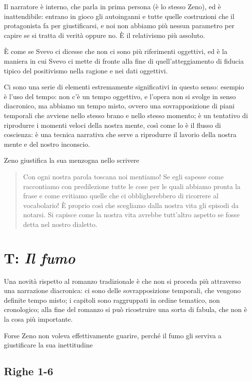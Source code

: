 \documentclass[a4paper, twoside, titlepage]{book}
\newcommand{\citazione}[1]{%
  \begin{quotation}
  \noindent #1
  \end{quotation}}
\begin{document}
Il narratore è interno, che parla in prima persona (è lo stesso Zeno), ed è inattendibile: entrano in gioco gli autoinganni e tutte quelle costruzioni che il protagonista fa per giustificarsi, e noi non abbiamo più nessun parametro per capire se si tratta di verità oppure no. È il relativismo più assoluto.

È come se Svevo ci dicesse che non ci sono più riferimenti oggettivi, ed è la maniera in cui Svevo ci mette di fronte alla fine di quell'atteggiamento di fiducia tipico del positivismo nella ragione e nei dati oggettivi.

Ci sono una serie di elementi estremamente significativi in questo senso: esempio è l'uso del tempo: non c'è un tempo oggettivo, e l'opera non si svolge in senso diacronico, ma abbiamo un tempo misto, ovvero una sovrapposizione di piani temporali che avviene nello stesso brano e nello stesso momento; è un tentativo di riprodurre i momenti veloci della nostra mente, così come lo è il flusso di coscienza: è una tecnica narrativa che serve a riprodurre il lavorio della nostra mente e del nostro inconscio.

Zeno giustifica la sua menzogna nello scrivere
\citazione{Con ogni nostra parola toscana noi mentiamo! Se egli sapesse come raccontiamo con predilezione tutte le cose per le quali abbiamo pronta la frase e come evitiamo quelle che ci obbligherebbero di ricorrere al vocabolario! È proprio così che scegliamo dalla nostra vita gli episodi da notarsi. Si capisce come la nostra vita avrebbe tutt'altro aspetto se fosse detta nel nostro dialetto.}

\section{T: \textit{Il fumo}}

Una novità rispetto al romanzo tradizionale è che non si proceda più attraverso una narrazione diacronica: ci sono delle sovrapposizione temporali, che vengono definite tempo misto;
i capitoli sono raggruppati in ordine tematico, non cronologico; alla fine del romanzo si può ricostruire una sorta di fabula, che non è la cosa più importante.

Forse Zeno non voleva effettivamente guarire, perché il fumo gli serviva a giustificare la sua inettitudine

\subsection*{Righe 1-6}
\end{document}
